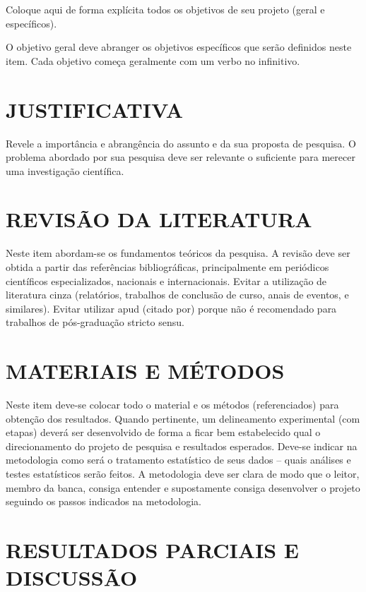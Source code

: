 \documentclass[oneside, 12pt,article, a4paper]{memoir}
\begin{document}
Coloque aqui de forma explícita\cite{Sommerville2011} todos os objetivos de seu projeto (geral e específicos). 

O objetivo geral deve abranger os objetivos específicos que serão definidos neste item. Cada objetivo começa geralmente com um verbo no infinitivo.

\chapter{JUSTIFICATIVA}

Revele a importância e abrangência do assunto e da sua proposta de pesquisa. O problema abordado por sua pesquisa deve ser relevante o suficiente para merecer uma investigação científica.

\chapter{REVISÃO DA LITERATURA}

Neste item abordam-se os fundamentos teóricos da pesquisa. A revisão deve ser obtida a partir das referências bibliográficas, principalmente em periódicos científicos especializados, nacionais e internacionais. Evitar a utilização de literatura cinza (relatórios, trabalhos de conclusão de curso, anais de eventos, e similares). Evitar utilizar apud (citado por) porque não é recomendado para trabalhos de pós-graduação stricto sensu.

\chapter{MATERIAIS E MÉTODOS}

Neste item deve-se colocar todo o material e os métodos (referenciados) para obtenção dos resultados. Quando pertinente, um delineamento experimental (com etapas) deverá ser desenvolvido de forma a ficar bem estabelecido qual o direcionamento do projeto de pesquisa e resultados esperados. Deve-se indicar na metodologia como será o tratamento estatístico de seus dados – quais análises e testes estatísticos serão feitos. 
A metodologia deve ser clara de modo que o leitor, membro da banca, consiga entender e supostamente consiga desenvolver o projeto seguindo os passos indicados na metodologia.

\chapter{RESULTADOS PARCIAIS E DISCUSSÃO}
\end{document}

